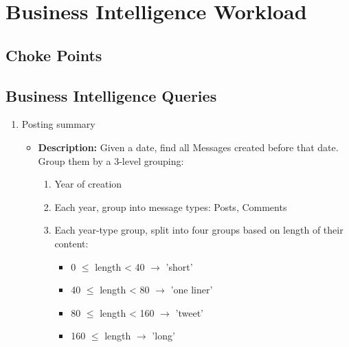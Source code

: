 \section{Business Intelligence Workload}
\subsection{Choke Points}

\subsection{Business Intelligence Queries}

{\small
    \begin{enumerate}
      \item Posting summary
            \begin{itemize}
                \item \textbf{Description:}
                  Given a date, find all Messages created before that date. \\
                  Group them by a 3-level grouping: \\

                  \begin{enumerate}
                    \item Year of creation
                    \item Each year, group into message types: Posts, Comments
                    \item Each year-type group, split into four groups based on length of their content:
                          \begin{itemize}
                            \item 0 $\le$ length < 40 $\rightarrow$ 'short'
                            \item 40 $\le$ length < 80 $\rightarrow$ 'one liner'
                            \item 80 $\le$ length < 160 $\rightarrow$ 'tweet'
                            \item 160 $\le$ length $\rightarrow$ 'long'
                          \end{itemize}
                  \end{enumerate}


\end{itemize}
\end{enumerate}}
